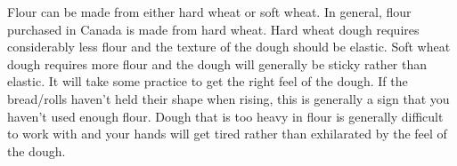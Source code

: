 \begin{minipage}{\linewidth}
Flour can be made from either hard wheat or soft wheat. In general, flour purchased in Canada is made from hard wheat. Hard wheat dough requires considerably less flour and the texture of the dough should be elastic. Soft wheat dough requires more flour and the dough will generally be sticky rather than elastic. It will take some practice to get the right feel of the dough. If the bread/rolls haven't held their shape when rising, this is generally a sign that you haven't used enough flour. Dough that is too heavy in flour is generally difficult to work with and your hands will get tired rather than exhilarated by the feel of the dough.
\end{minipage}